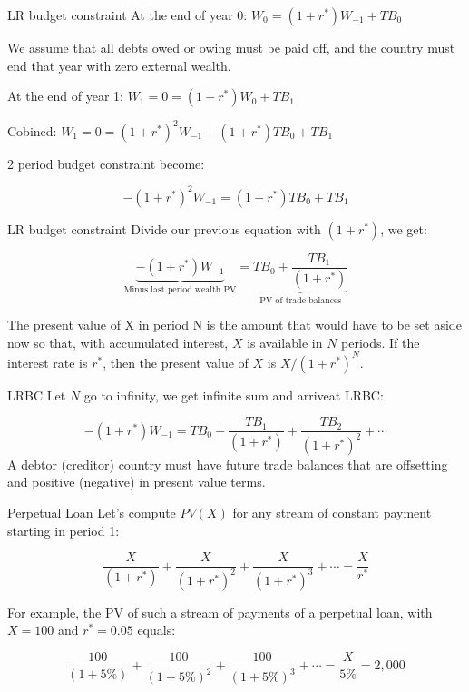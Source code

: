 \documentclass[
  ignorenonframetext,
]{beamer}
\begin{document}
\begin{frame}{LR budget constraint}
\label{lr-budget-constraint}
At the end of year 0: \(W_0=(1+r^*)W_{-1}+TB_0\)

We assume that all debts owed or owing must be paid off, and the country
must end that year with zero external wealth.

At the end of year 1: \(W_1=0=(1+r^*)W_0+TB_1\)

Cobined: \(W_1=0=(1+r^*)^2W_{-1}+(1+r^*)TB_0+TB_1\)

2 period budget constraint become:

\[
-(1+r^*)^2W_{-1}=(1+r^*)TB_0+TB_1
\]
\end{frame}

\begin{frame}{LR budget constraint}
\label{lr-budget-constraint-1}
Divide our previous equation with \((1+r^*)\), we get:

\[
\underbrace{-(1+r^*)W_{-1}}_{\text{Minus last period wealth PV}}=\underbrace{TB_0+\frac{TB_1}{(1+r^*)}}_{\text{PV of trade balances}}
\]

The present value of X in period N is the amount that would have to be
set aside now so that, with accumulated interest, \(X\) is available in
\(N\) periods. If the interest rate is \(r^*\), then the present value
of \(X\) is \(X/(1 + r^*)^N\).
\end{frame}

\begin{frame}{LRBC}
\label{lrbc}
Let \(N\) go to infinity, we get infinite sum and arriveat LRBC:

\[
-(1+r^*)W_{-1}=TB_0+\frac{TB_1}{(1+r^*)}+\frac{TB_2}{(1+r^*)^2}+\cdots
\] A debtor (creditor) country must have future trade balances that are
offsetting and positive (negative) in present value terms.
\end{frame}

\begin{frame}{Perpetual Loan}
\label{perpetual-loan}
Let's compute \(PV(X)\) for any stream of constant payment starting in
period 1:

\[
\frac{X}{(1+r^*)}+\frac{X}{(1+r^*)^2}+\frac{X}{(1+r^*)^3}+\cdots=\frac{X}{r^*}
\]

For example, the PV of such a stream of payments of a perpetual loan,
with \(X=100\) and \(r^*=0.05\) equals:

\[
\frac{100}{(1+5\%)}+\frac{100}{(1+5\%)^2}+\frac{100}{(1+5\%)^3}+\cdots=\frac{X}{5\%}=2,000
\]
\end{frame}
\end{document}
